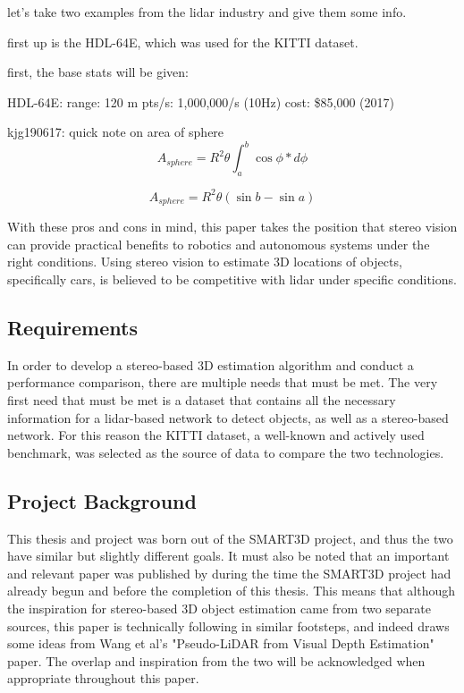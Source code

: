 let's take two examples from the lidar industry and give them some info. 

first up is the HDL-64E, which was used for the KITTI dataset. 

first, the base stats will be given: 


HDL-64E:
range: 120 m
pts/s: 1,000,000/s (10Hz)
cost: \$85,000 (2017)


kjg190617: quick note on area of sphere
$$ A_{sphere}=R^2\theta \int_{a}^{b}\cos\phi*d\phi $$

$$ A_{sphere}=R^2\theta (\sin{b} - \sin{a})$$


With these pros and cons in mind, this paper takes the position that stereo vision can provide practical benefits to robotics and autonomous systems under the right conditions. Using stereo vision to estimate 3D locations of objects, specifically cars, is believed to be competitive with lidar under specific conditions.









\subsection{Requirements}
In order to develop a stereo-based 3D estimation algorithm and conduct a performance comparison, there are multiple needs that must be met. The very first need that must be met is a dataset that contains all the necessary information for a lidar-based network to detect objects, as well as a stereo-based network. For this reason the KITTI dataset, a well-known and actively used benchmark, was selected as the source of data to compare the two technologies.


\subsection{Project Background}
This thesis and project was born out of the SMART3D project, and thus the two have similar but slightly different goals. It must also be noted that an important and relevant paper was published by \cite{wang_pseudo-lidar_2019} during the time the SMART3D project had already begun and before the completion of this thesis. This means that although the inspiration for stereo-based 3D object estimation came from two separate sources, this paper is technically following in similar footsteps, and indeed draws some ideas from Wang et al's "Pseudo-LiDAR from Visual Depth Estimation" paper. The overlap and inspiration from the two will be acknowledged when appropriate throughout this paper. 

